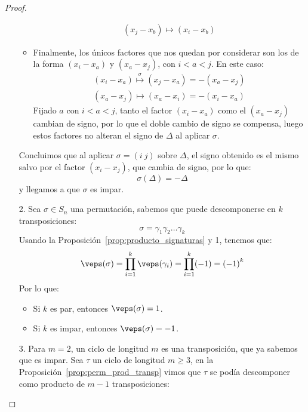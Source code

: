 \begin{prop}
\begin{proof}
\begin{enumerate}
\begin{itemize}
\begin{align*}
                            (x_j - x_b) \longmapsto (x_i - x_b) 
                        \end{align*}
                    \item Finalmente, los únicos factores que nos quedan por considerar son los de la forma $(x_i - x_a)$ y $(x_a - x_j)$, con $i < a < j$. En este caso:
                        \begin{align*}
                            (x_i - x_a) \stackrel{\sigma}{\longmapsto} (x_j - x_a) = -(x_a - x_j) \\
                            (x_a - x_j) \longmapsto (x_a - x_i) = -(x_i - x_a) 
                        \end{align*}
                        Fijado $a$ con $i<a<j$, tanto el factor $(x_i - x_a)$ como el $(x_a - x_j)$ cambian de signo, por lo que el doble cambio de signo se compensa, luego estos factores no alteran el signo de $\Delta$ al aplicar $\sigma$.
                \end{itemize}
                Concluimos que al aplicar $\sigma = (i\ j)$ sobre $\Delta$, el signo obtenido es el mismo salvo por el factor $(x_i - x_j)$, que cambia de signo, por lo que:
                \begin{equation*}
                    \sigma(\Delta) = -\Delta
                \end{equation*}
                y llegamos a que $\sigma$ es impar.
            \item[2.] Sea $\sigma\in S_n$ una permutación, sabemos que puede descomponerse en $k$ transposiciones:
                \begin{equation*}
                    \sigma = \gamma_1\gamma_2\ldots\gamma_k
                \end{equation*}
                Usando la Proposición~\ref{prop:producto_signaturas} y 1, tenemos que:
                \begin{equation*}
                    \veps(\sigma) = \prod_{i=1}^{k}\veps(\gamma_i) = \prod_{i=1}^{k}(-1) = {(-1)}^{k}
                \end{equation*}
                Por lo que:
                \begin{itemize}
                    \item Si $k$ es par, entonces $\veps(\sigma)=1$.
                    \item Si $k$ es impar, entonces $\veps(\sigma)=-1$.
                \end{itemize}
            \item[3.] Para $m=2$, un ciclo de longitud $m$ es una transposición, que ya sabemos que es impar. Sea $\tau$ un ciclo de longitud $m\geq 3$, en la Proposición~\ref{prop:perm_prod_transp} vimos que $\tau$ se podía descomponer como producto de $m-1$ transposiciones:

\end{enumerate}
\end{proof}
\end{prop}
